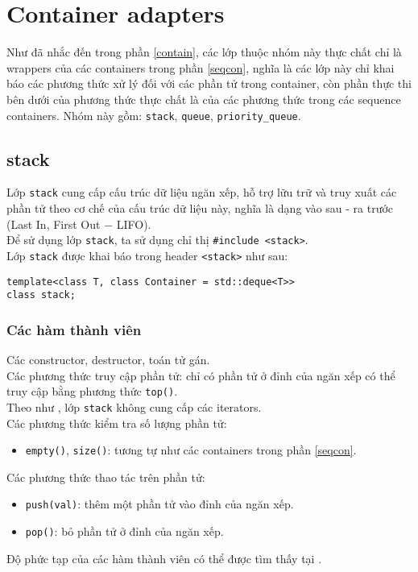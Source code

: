\section{Container adapters}
Như đã nhắc đến trong phần \ref{contain}, các lớp thuộc nhóm này thực chất chỉ là wrappers của các containers trong phần \ref{seqcon}, nghĩa là các lớp này chỉ khai báo các phương thức xử lý đối với các phần tử trong container, còn phần thực thi bên dưới của phương thức thực chất là của các phương thức trong các sequence containers. Nhóm này gồm: \lstinline{stack}, \lstinline{queue}, \lstinline{priority_queue}.
\subsection{stack}
Lớp \lstinline{stack} cung cấp cấu trúc dữ liệu ngăn xếp, hỗ trợ lữu trữ và truy xuất các phần tử theo cơ chế của cấu trúc dữ liệu này, nghĩa là dạng vào sau - ra trước (Last In, First Out $-$ LIFO). \\
Để sử dụng lớp \lstinline{stack}, ta sử dụng chỉ thị \lstinline{#include <stack>}.\\
Lớp \lstinline{stack} được khai báo trong header \lstinline{<stack>} như sau: \cite{stack}
\begin{lstlisting}
template<class T, class Container = std::deque<T>> 
class stack;
\end{lstlisting}
\subsubsection{Các hàm thành viên}
Các constructor, destructor, toán tử gán.\\
Các phương thức truy cập phần tử: chỉ có phần tử ở đỉnh của ngăn xếp  có thể truy cập bằng phương thức \lstinline{top()}.\\
Theo như \cite{stack}, lớp \lstinline{stack} không cung cấp các iterators.\\
Các phương thức kiểm tra số lượng phần tử:
\begin{itemize}
    \item \lstinline{empty()}, \lstinline{size()}: tương tự như các containers trong phần \ref{seqcon}.
\end{itemize}
Các phương thức thao tác trên phần tử:
\begin{itemize}
    \item \lstinline{push(val)}: thêm một phần tử vào đỉnh của ngăn xếp.
    \item \lstinline{pop()}: bỏ phần tử ở đỉnh của ngăn xếp.
\end{itemize}
Độ phức tạp của các hàm thành viên có thể được tìm thấy tại \cite{stack}.
